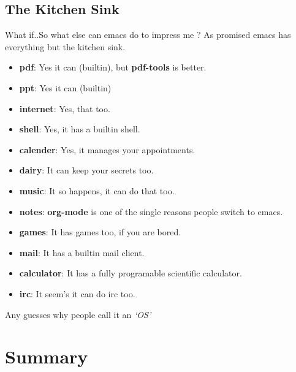 \documentclass{beamer}
\begin{document}
\subsection{The Kitchen Sink}
\begin{frame}{What if..}{So what else can emacs do to impress me ?}
	As promised emacs has everything but the kitchen sink.
	\pause 
	\begin{itemize}
		\item {
				\textbf{pdf}: Yes it can (builtin), but \textbf{pdf-tools} is better.
				\pause
				}
		\item {
				\textbf{ppt}: Yes it can (builtin)
				\pause
				}
		\item {
				\textbf{internet}: Yes, that too.
				\pause
				}
		\item {
				\textbf{shell}: Yes, it has a builtin shell.
				\pause
				}
		\item {
				\textbf{calender}: Yes, it manages your appointments.
				\pause
				}
		\item{
				\textbf{dairy}: It can keep your secrets too.
				\pause
				}
		\item{
				\textbf{music}: It so happens, it can do that too.
				\pause
				}
		\item{
				\textbf{notes}: \textbf{org-mode} is one of the single reasons people switch to emacs.
				\pause
				}
		\item{
				\textbf{games}: It has games too, if you are bored.
				\pause
				}

		\item{
				\textbf{mail}: It has a builtin mail client.
				\pause
				}
		\item{
				\textbf{calculator}: It has a fully programable scientific calculator.
				\pause
				}
		\item{
				\textbf{irc}: It seem's it can do irc too.
				\pause
				}

	\end{itemize}
	Any guesses why people call it an  {\em`OS'}
\end{frame}
\section*{Summary}
\end{document}
